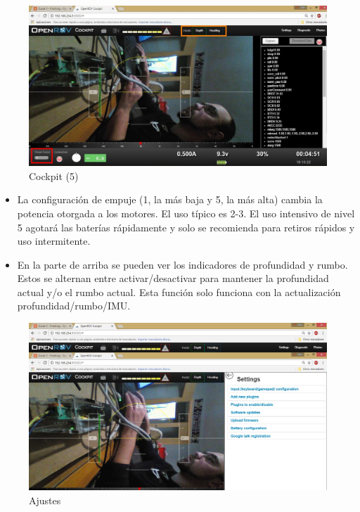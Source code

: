 \begin{figure} [hbtp]
\begin{center}
  \includegraphics[width=12cm]{img/cap3/3_5/cockpit5}
\end{center}
\caption{Cockpit (5)}
\label{fig:cockpit5}
\end{figure}
\begin{itemize}
\item[\textcolor{red}{\textbullet}]La configuración de empuje (1, la más baja y 5, la más alta) cambia la potencia otorgada a los motores. El uso típico es 2-3. El uso intensivo de nivel 5 agotará las baterías rápidamente y solo se recomienda para retiros rápidos y uso intermitente.
\item[\textcolor{orange}{\textbullet}]En la parte de arriba se pueden ver los indicadores de profundidad y rumbo. Estos se alternan entre activar/desactivar para mantener la profundidad actual y/o el rumbo actual. Esta función solo funciona con la actualización profundidad/rumbo/IMU.
\end{itemize}

\begin{figure} [hbtp]
\begin{center}
  \includegraphics[width=12cm]{img/cap3/3_5/setting}
\end{center}
\caption{Ajustes}
\label{fig:settting}
\end{figure}

